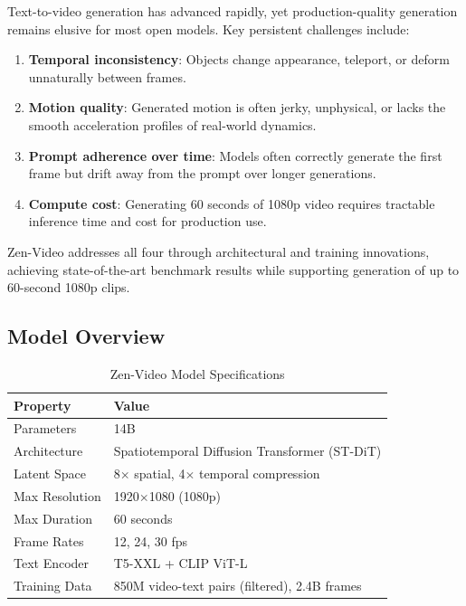 \documentclass[11pt,a4paper]{article}
\begin{document}
Text-to-video generation has advanced rapidly, yet production-quality generation remains elusive
for most open models. Key persistent challenges include:

\begin{enumerate}
    \item \textbf{Temporal inconsistency}: Objects change appearance, teleport, or deform
    unnaturally between frames.
    \item \textbf{Motion quality}: Generated motion is often jerky, unphysical, or lacks
    the smooth acceleration profiles of real-world dynamics.
    \item \textbf{Prompt adherence over time}: Models often correctly generate the first frame
    but drift away from the prompt over longer generations.
    \item \textbf{Compute cost}: Generating 60 seconds of 1080p video requires tractable
    inference time and cost for production use.
\end{enumerate}

Zen-Video addresses all four through architectural and training innovations, achieving
state-of-the-art benchmark results while supporting generation of up to 60-second 1080p clips.

\subsection{Model Overview}

\begin{table}[H]
\centering
\begin{tabular}{ll}
\toprule
\textbf{Property} & \textbf{Value} \\
\midrule
Parameters & 14B \\
Architecture & Spatiotemporal Diffusion Transformer (ST-DiT) \\
Latent Space & 8$\times$ spatial, 4$\times$ temporal compression \\
Max Resolution & 1920$\times$1080 (1080p) \\
Max Duration & 60 seconds \\
Frame Rates & 12, 24, 30 fps \\
Text Encoder & T5-XXL + CLIP ViT-L \\
Training Data & 850M video-text pairs (filtered), 2.4B frames \\
\bottomrule
\end{tabular}
\caption{Zen-Video Model Specifications}
\end{table}
\end{document}
